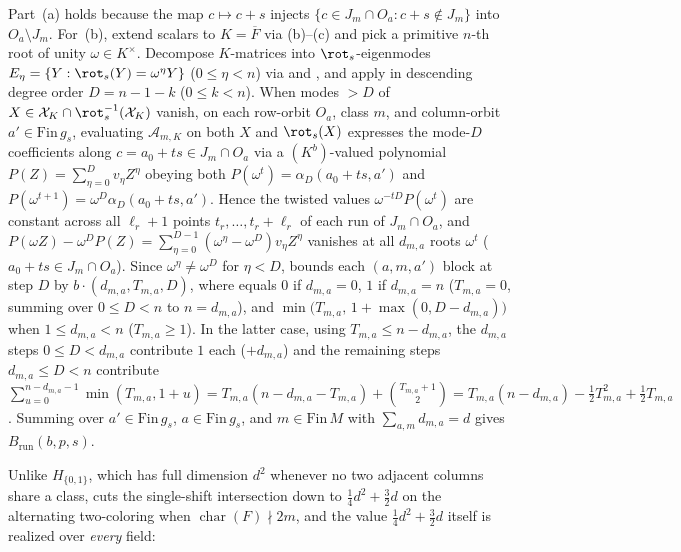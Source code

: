 \begin{outline}
Part~(a) holds because the map $c \mapsto c + s$ injects $\{c \in J_m \cap O_a : c + s \notin J_m\}$
into $O_a \setminus J_m$. For~(b), extend scalars to $K = \overline{F}$ via
(b)--(c) and pick a primitive $n$-th root of unity $\omega \in K^\times$.
Decompose $K$-matrices into $\rot_s$-eigenmodes $E_\eta = \{Y : \rot_s(Y) = \omega^\eta Y\}$
($0 \le \eta < n$) via  and , and apply
 in descending degree order
$D = n - 1 - k$ ($0 \le k < n$). When modes $> D$ of $X \in \mathcal{X}_K \cap \rot_s^{-1}(\mathcal{X}_K)$
vanish, on each row-orbit $O_a$, class $m$, and column-orbit $a' \in \mathrm{Fin}\,g_s$, evaluating
$\mathcal{A}_{m,K}$ on both $X$ and $\rot_s(X)$ expresses the mode-$D$ coefficients along
$c = a_0 + t s \in J_m \cap O_a$ via a $(K^b)$-valued polynomial $P(Z) = \sum_{\eta=0}^D v_\eta Z^\eta$
obeying both $P(\omega^t) = \alpha_D(a_0 + t s, a')$ and
$P(\omega^{t+1}) = \omega^D \alpha_D(a_0 + t s, a')$. Hence the twisted values $\omega^{-t D} P(\omega^t)$
are constant across all $\ell_r + 1$ points $t_r, \dots, t_r + \ell_r$ of each run of $J_m \cap O_a$, and
$P(\omega Z) - \omega^D P(Z) = \sum_{\eta=0}^{D-1} (\omega^\eta - \omega^D) v_\eta Z^\eta$ vanishes at all
$d_{m,a}$ roots $\omega^t$ ($a_0 + t s \in J_m \cap O_a$). Since $\omega^\eta \ne \omega^D$ for $\eta < D$,
 bounds each $(a, m, a')$ block at step $D$ by
$b \cdot {}$$(d_{m,a}, T_{m,a}, D)$, where  equals $0$ if $d_{m,a} = 0$,
$1$ if $d_{m,a} = n$ ($T_{m,a} = 0$, summing over $0 \le D < n$ to $n = d_{m,a}$), and
$\min\bigl(T_{m,a},\, 1 + \max(0, D - d_{m,a})\bigr)$ when $1 \le d_{m,a} < n$ ($T_{m,a} \ge 1$). In the
latter case, using $T_{m,a} \le n - d_{m,a}$, the $d_{m,a}$ steps $0 \le D < d_{m,a}$ contribute $1$ each
($+ d_{m,a}$) and the remaining steps $d_{m,a} \le D < n$ contribute
$\sum_{u=0}^{n - d_{m,a} - 1} \min(T_{m,a}, 1 + u) = T_{m,a}(n - d_{m,a} - T_{m,a}) + \binom{T_{m,a}+1}{2}
= T_{m,a}(n - d_{m,a}) - \frac{1}{2}T_{m,a}^2 + \frac{1}{2}T_{m,a}$. Summing over
$a' \in \mathrm{Fin}\,g_s$, $a \in \mathrm{Fin}\,g_s$, and $m \in \mathrm{Fin}\,M$ with
$\sum_{a, m} d_{m,a} = d$ gives $B_{\mathrm{run}}(b, p, s)$.
\end{outline}

Unlike $H_{\{0, 1\}}$, which has full dimension $d^2$ whenever no two adjacent columns share a class,
 cuts the single-shift intersection down to $\frac{1}{4}d^2 + \frac{3}{2}d$
on the alternating two-coloring when $\operatorname{char}(F) \nmid 2m$, and the value
$\frac{1}{4}d^2 + \frac{3}{2}d$ itself is realized over \emph{every} field:


